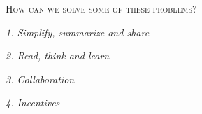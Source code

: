 \documentclass[a4paper,12pt]{article}
\renewcommand{\section}[1]{
  \bigskip
  \begin{center}
  \begin{Large}
  \normalfont\scshape #1
  \medskip
  \end{Large}
  \end{center}
}
\renewcommand{\subsection}[1]{
  \bigskip
  \begin{center}
  \begin{large}
  \normalfont\itshape #1
  \end{large}
  \end{center}
}
\begin{document}


\section{How can we solve some of these problems?}

\subsection{1. Simplify, summarize and share}
\subsection{2. Read, think and learn}
\subsection{3. Collaboration}
\subsection{4. Incentives}

\end{document}
